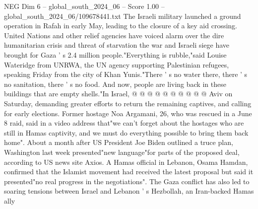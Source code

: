 \begin{textsample}{NEG Dim 6 – global\_south\_2024\_06 – Score 1.00 – global\_south\_2024\_06/109678441.txt}
The Israeli military launched a ground operation in Rafah in early May, leading to the closure of a key aid crossing.
United Nations and other relief agencies have voiced alarm over the dire humanitarian crisis and threat of starvation the war and Israeli siege have brought for Gaza ' s 2.4 million people."Everything is rubble,"said Louise Wateridge from UNRWA, the UN agency supporting Palestinian refugees, speaking Friday from the city of Khan Yunis."There ' s no water there, there ' s no sanitation, there ' s no food.
And now, people are living back in these buildings that are empty shells."In Israel, @ @ @ @ @ @ @ @ @ @ Aviv on Saturday, demanding greater efforts to return the remaining captives, and calling for early elections.
Former hostage Noa Argamani, 26, who was rescued in a June 8 raid, said in a video address that"we can't forget about the hostages who are still in Hamas captivity, and we must do everything possible to bring them back home".
About a month after US President Joe Biden outlined a truce plan, Washington last week presented"new language"for parts of the proposed deal, according to US news site Axios.
A Hamas official in Lebanon, Osama Hamdan, confirmed that the Islamist movement had received the latest proposal but said it presented"no real progress in the negotiations".
The Gaza conflict has also led to soaring tensions between Israel and Lebanon ' s Hezbollah, an Iran-backed Hamas ally

\end{textsample}
